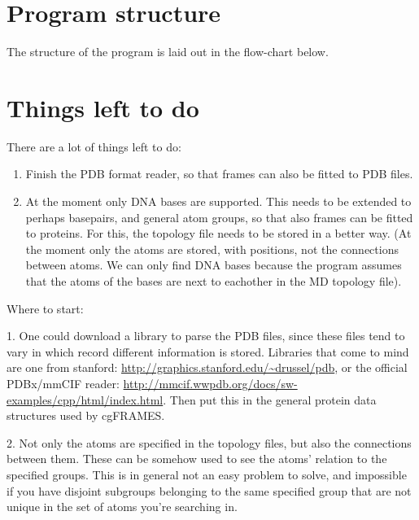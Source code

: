 \documentclass[a4paper,11pt]{scrartcl}
\begin{document}
\section{Program structure}
The structure of the program is laid out in the flow-chart below.

\begin{figure}
    \centering
{}
\end{figure}


\section{Things left to do}
There are a lot of things left to do:
\begin{enumerate}
    \item Finish the PDB format reader, so that frames can also be fitted to PDB files.
    \item At the moment only DNA bases are supported. This needs to be extended to perhaps basepairs, and general atom groups, so that also frames can be fitted to proteins. For this, the topology file needs to be stored in a better way. (At the moment only the atoms are stored, with positions, not the connections between atoms. We can only find DNA bases because the program assumes that the atoms of the bases are next to eachother in the MD topology file).
\end{enumerate}

Where to start:

1. One could download a library to parse the PDB files, since these files tend to vary in which record different information is stored. Libraries that come to mind are one from stanford: \url{http://graphics.stanford.edu/~drussel/pdb}, or the official PDBx/mmCIF reader: \url{http://mmcif.wwpdb.org/docs/sw-examples/cpp/html/index.html}. Then put this in the general protein data structures used by cgFRAMES. 

2. Not only the atoms are specified in the topology files, but also the connections between them. These can be somehow used to see the atoms' relation to the specified groups. This is in general not an easy problem to solve, and impossible if you have disjoint subgroups belonging to the same specified group that are not unique in the set of atoms you're searching in.
%
%
\end{document}
